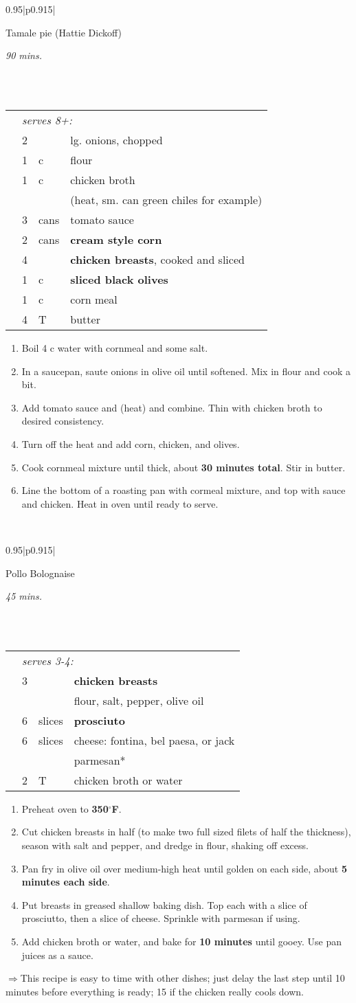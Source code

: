 \documentclass[8pt]{report}
\newcommand{\ingredmargin}{0.25cm}
\newcommand{\F}{$^\circ$F}
\newenvironment{recipe}[3]
  {\bigskip \bigskip 
\begin{tabular*}{0.95\textwidth}{|p{0.915\textwidth}|} \hline \vspace{0.25mm}
\begin{minipage}{0.7\textwidth}	\begin{flushleft} {\Large \textsf{#1}} \end{flushleft} \end{minipage}
\begin{minipage}{0.2\textwidth} \begin{flushright} \emph{#2} \end{flushright} \end{minipage} \\ \\ \hline
\begin{ingreds}{#3} \addcontentsline{toc}{section}{#1} \phantomsection \label{rec:#1}} 
  {\\ \hline \end{tabular*} \noindent}
\newenvironment{creditrecipe}[4]
  {\bigskip \bigskip 
\begin{tabular*}{0.95\textwidth}{|p{0.915\textwidth}|} \hline \vspace{0.25mm}
\begin{minipage}{0.7\textwidth}	\begin{flushleft} {\Large \textsf{#1} (#4)} \end{flushleft} \end{minipage}
\begin{minipage}{0.2\textwidth} \begin{flushright} \emph{#2} \end{flushright} \end{minipage} \\ \\ \hline
\begin{ingreds}{#3} \addcontentsline{toc}{section}{#1} \phantomsection \label{rec:#1}} 
  {\\ \hline \end{tabular*} \noindent}
\newenvironment{ingreds}[1]
  {\begin{tabular}{lrlp{0.6\textwidth}} \hspace{\ingredmargin} & \multicolumn{3}{l}{\it #1:} \\}
  {\end{tabular} \medskip}
\newcommand{\ingredsdone}{\end{ingreds}\begin{enumerate}}
\newcommand{\stepsdone}{\end{enumerate} \medskip}
\newcommand{\ingredient}[3]{\hspace{\ingredmargin} & #1 & #2 & #3 \\}
\newcommand{\tip}{$\Rightarrow$}
\begin{document}
\begin{creditrecipe}{Tamale pie}{90 mins.}{serves 8+}{Hattie Dickoff}
\index{casseroles!tamale pie} \index{tamale pie} \index{mexican!tamale pie}
\ingredient{2}{}{lg. onions, chopped}
\ingredient{1}{c}{flour}
\ingredient{1}{c}{chicken broth}
\ingredient{}{}{(heat, sm. can green chiles for example)}
\ingredient{3}{cans}{tomato sauce}
\ingredient{2}{cans}{\bf cream style corn}
\ingredient{4}{}{{\bf chicken breasts}, cooked and sliced}
\ingredient{1}{c}{\bf sliced black olives}
\ingredient{1}{c}{corn meal}
\ingredient{4}{T}{butter}
\ingredsdone
\item Boil 4 c water with cornmeal and some salt.
\item In a saucepan, saute onions in olive oil until softened.  Mix in flour and cook a bit.
\item Add tomato sauce and (heat) and combine.  Thin with chicken broth to desired consistency.
\item Turn off the heat and add corn, chicken, and olives.
\item Cook cornmeal mixture until thick, about {\bf 30 minutes total}.  Stir in butter.
\item Line the bottom of a roasting pan with cormeal mixture, and top with sauce and chicken.  Heat in oven until ready to serve.
\stepsdone
\end{creditrecipe}

\begin{recipe}{Pollo Bolognaise}{45 mins.}{serves 3-4}
\index{pollo bolognaise} \index{bolognaise!pollo bolognaise}
\index{chicken!pollo bolognaise}
\ingredient{3}{}{\bf chicken breasts}
\ingredient{}{}{flour, salt, pepper, olive oil}
\ingredient{6}{slices}{\bf prosciuto}
\ingredient{6}{slices}{cheese: fontina, bel paesa, or jack}
\ingredient{}{}{parmesan*}
\ingredient{2}{T}{chicken broth or water}
\ingredsdone
\item Preheat oven to {\bf 350\F}.
\item Cut chicken breasts in half (to make two full sized filets of half the thickness), season with salt and pepper, and dredge in flour, shaking off excess.
\item Pan fry in olive oil over medium-high heat until golden on each side, about {\bf 5 minutes each side}.
\item Put breasts in greased shallow baking dish.  Top each with a slice of prosciutto, then a slice of cheese.  Sprinkle with parmesan if using.
\item Add chicken broth or water, and bake for {\bf 10 minutes} until gooey.  Use pan juices as a sauce.
\stepsdone
\noindent \tip This recipe is easy to time with other dishes; just delay the last step until 10 minutes before everything is ready; 15 if the chicken really cools down.  
\end{recipe}
\end{document}

